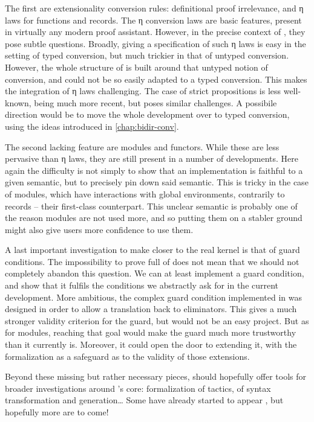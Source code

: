 The first are extensionality conversion rules: definitional proof irrelevance,
and η laws for functions and records.
The η conversion laws are basic features, present in virtually
any modern proof assistant. However,
in the precise context of , they pose subtle questions.%
%
Broadly, giving a specification of such η laws is easy in the setting of typed conversion, but
much trickier in that of untyped conversion. However, the whole structure of  is built
around that untyped notion of conversion, and could not be so easily adapted to a typed
conversion. This makes the integration of η laws challenging. The case of strict propositions is
less well-known, being much more recent, but poses similar challenges.
A possibile direction would be to move the whole development over to typed conversion,
using the ideas introduced in \cref{chap:bidir-conv}.

The second lacking feature are modules and functors.
While these are less pervasive than η laws, they are still present in a number of developments.
Here again the difficulty is not simply to show that an implementation is faithful to a given
semantic, but to precisely pin down said semantic. This is tricky in the case of modules, which
have interactions with global environments, contrarily to records – their first-class counterpart.
This unclear semantic is probably one of the reason modules are not used more, and so putting
them on a stabler ground might also give users more confidence to use them.

A last important investigation to make  closer to the real kernel is that of
guard conditions. The impossibility to prove full  of 
does not mean that we should not completely abandon this question. We
can at least implement a guard condition,
and show that it fulfils the conditions we abstractly ask for
in the current development. More ambitious, the complex guard condition implemented in 
was designed  in order to allow a translation back to eliminators.
This gives a much stronger validity criterion for the guard, but would not be an easy project.
But as for modules, reaching
that goal would make the guard much more trustworthy than it currently is. Moreover,
it could open the door to extending it, with the formalization
as a safeguard as to the validity of those extensions.

Beyond these missing but rather necessary pieces,
 should hopefully offer tools for
broader investigations around ’s core: formalization of tactics,
of syntax transformation and generation… Some have already started to appear
, but hopefully more are to come!

